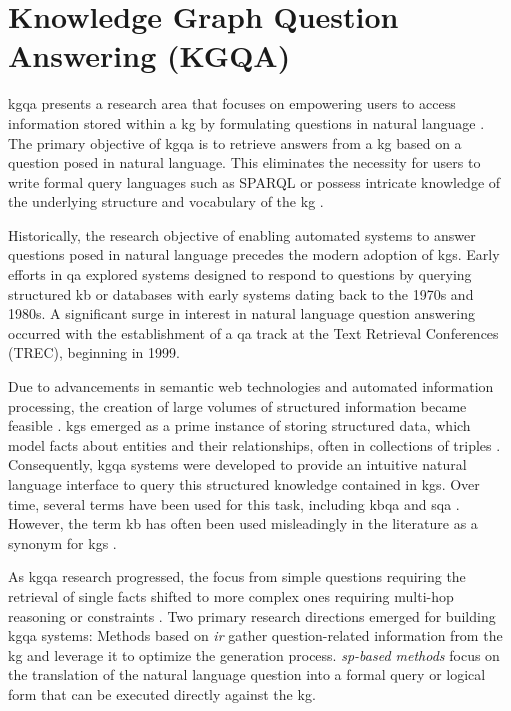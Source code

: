 
\section{Knowledge Graph Question Answering (KGQA)}

\acrfull{kgqa} presents a research area that focuses on empowering users to access information stored within a \gls{kg} by formulating questions in natural language \cite{banerjee_knowledge_2024,chakraborty_introduction_2021,chakraborty_introduction_2019,pan_unifying_2024,yani_better_2022}. The primary objective of \gls{kgqa} is to retrieve answers from a \gls{kg} based on a question posed in natural language. This eliminates the necessity for users to write formal query languages such as SPARQL or possess intricate knowledge of the underlying structure and vocabulary of the \gls{kg} \cite{chakraborty_introduction_2021,chakraborty_introduction_2019,sabou_survey_2017}.

Historically, the research objective of enabling automated systems to answer questions posed in natural language precedes the modern adoption of \glspl{kg}. Early efforts in \acrfull{qa} explored systems designed to respond to questions by querying structured \acrfull{kb} or databases with early systems dating back to the 1970s and 1980s. A significant surge in interest in natural language question answering occurred with the establishment of a \gls{qa} track at the Text Retrieval Conferences (TREC), beginning in 1999. \cite{hirschman_natural_2001}

Due to advancements in semantic web technologies and automated information processing, the creation of large volumes of structured information became feasible \cite{chakraborty_introduction_2019}. \glspl{kg} emerged as a prime instance of storing structured data, which model facts about entities and their relationships, often in collections of triples \cite{chakraborty_introduction_2019,hogan_knowledge_2022,ji_survey_2022}. Consequently, \gls{kgqa} systems were developed to provide an intuitive natural language interface to query this structured knowledge contained in \glspl{kg}. Over time, several terms have been used for this task, including \acrfull{kbqa} \cite{ehrlinger_towards_2016} and \acrfull{sqa} \cite{sabou_survey_2017}. However, the term \gls{kb} has often been used misleadingly in the literature as a synonym for \glspl{kg} \cite{ehrlinger_towards_2016}.

 As \gls{kgqa} research progressed, the focus from simple questions requiring the retrieval of single facts shifted to more complex ones requiring multi-hop reasoning or constraints \cite{fu_survey_2020,banerjee_knowledge_2024,chakraborty_introduction_2021}. Two primary research directions emerged for building \gls{kgqa} systems: Methods based on \emph{\gls{ir}} gather question-related information from the \gls{kg} and leverage it to optimize the generation process. \emph{\gls{sp}-based methods} focus on the translation of the natural language question into a formal query or logical form that can be executed directly against the \gls{kg}.

